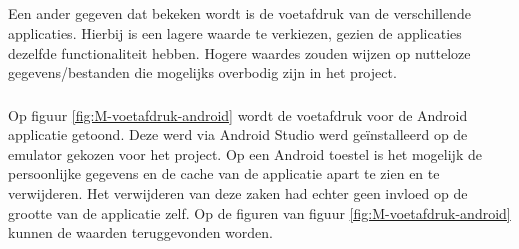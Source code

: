 \subsection{}
\label{sec:M-test-voetafdruk}
Een ander gegeven dat bekeken wordt is de voetafdruk van de verschillende applicaties. Hierbij is een lagere waarde te verkiezen,  gezien de applicaties dezelfde functionaliteit hebben. Hogere waardes zouden wijzen op nutteloze gegevens/bestanden die mogelijks overbodig zijn in het project.


\subsubsection{}
\label{sec:M-test-voetafdruk-android}
Op figuur \ref{fig:M-voetafdruk-android} wordt de voetafdruk voor de Android applicatie getoond. Deze werd via Android Studio werd geïnstalleerd op de emulator gekozen voor het project. Op een Android toestel is het mogelijk de persoonlijke gegevens en de cache van de applicatie apart te zien en te verwijderen. Het verwijderen van deze zaken had echter geen invloed op de grootte van de applicatie zelf. Op de figuren van figuur \ref{fig:M-voetafdruk-android} kunnen de waarden teruggevonden worden.

